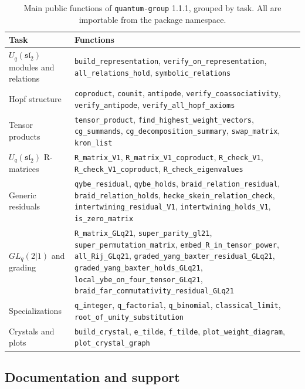 \documentclass{SciPost}
\newcommand{\pkg}{\texttt{quantum-group}}
\newcommand{\Uq}{U_q(\mathfrak{sl}_2)}
\newcommand{\GL}{GL_q(2|1)}
\begin{document}
\begin{table}[t]
\centering
\caption{Main public functions of \pkg{} 1.1.1, grouped by task. All are importable from the package namespace.}
\label{tab:api}
\small
\begin{tabularx}{\textwidth}{@{}>{\raggedright\arraybackslash}p{}>{\raggedright\arraybackslash}X@{}}
\toprule
Task & Functions \\
\midrule
$\Uq$ modules and relations & \texttt{build\_representation}, \texttt{verify\_on\_representation}, \texttt{all\_relations\_hold}, \texttt{symbolic\_relations} \\
Hopf structure & \texttt{coproduct}, \texttt{counit}, \texttt{antipode}, \texttt{verify\_coassociativity}, \texttt{verify\_antipode}, \texttt{verify\_all\_hopf\_axioms} \\
Tensor products & \texttt{tensor\_product}, \texttt{find\_highest\_weight\_vectors}, \texttt{cg\_summands}, \texttt{cg\_decomposition\_summary}, \texttt{swap\_matrix}, \texttt{kron\_list} \\
$\Uq$ R-matrices & \texttt{R\_matrix\_V1}, \texttt{R\_matrix\_V1\_coproduct}, \texttt{R\_check\_V1}, \texttt{R\_check\_V1\_coproduct}, \texttt{R\_check\_eigenvalues} \\
Generic residuals & \texttt{qybe\_residual}, \texttt{qybe\_holds}, \texttt{braid\_relation\_residual}, \texttt{braid\_relation\_holds}, \texttt{hecke\_skein\_relation\_check}, \texttt{intertwining\_residual\_V1}, \texttt{intertwining\_holds\_V1}, \texttt{is\_zero\_matrix} \\
$\GL$ and grading & \texttt{R\_matrix\_GLq21}, \texttt{super\_parity\_gl21}, \texttt{super\_permutation\_matrix}, \texttt{embed\_R\_in\_tensor\_power}, \texttt{all\_Rij\_GLq21}, \texttt{graded\_yang\_baxter\_residual\_GLq21}, \texttt{graded\_yang\_baxter\_holds\_GLq21}, \texttt{local\_ybe\_on\_four\_tensor\_GLq21}, \texttt{braid\_far\_commutativity\_residual\_GLq21} \\
Specializations & \texttt{q\_integer}, \texttt{q\_factorial}, \texttt{q\_binomial}, \texttt{classical\_limit}, \texttt{root\_of\_unity\_substitution} \\
Crystals and plots & \texttt{build\_crystal}, \texttt{e\_tilde}, \texttt{f\_tilde}, \texttt{plot\_weight\_diagram}, \texttt{plot\_crystal\_graph} \\
\bottomrule
\end{tabularx}
\end{table}

\subsection{Documentation and support}
\end{document}
